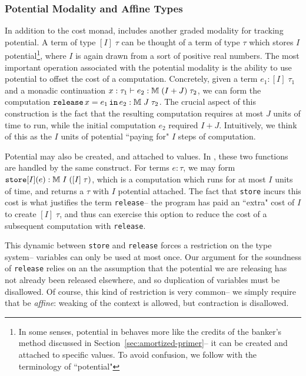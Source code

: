 \subsubsection{Potential Modality and Affine Types}
In addition to the cost monad, \lambdaamor includes another graded modality for tracking potential. A term of type $[I] \; \tau$ can be thought of a term of type $\tau$ which stores $I$ potential\footnote{
In some senses, potential in \lambdaamor behaves more like the credits of the banker's method discussed in Section~\ref{sec:amortized-primer}-- it can be created and attached to specific values. To avoid confusion, we follow \citet{rajani-et-al:popl21} with the terminology of ``potential"
}, where $I$ is again drawn from a sort of positive real numbers.
The most important operation associated with the potential modality is the ability to use potential to offset the cost of a computation. Concretely, given a term $e_1 : [I] \; \tau_1$ and a monadic continuation $x : \tau_1 \vdash e_2 : \mathbb{M} \; (I + J) \; \tau_2$, we can form the computation $\texttt{release}\, x = e_1 \, \texttt{in}\, e_2 : \mathbb{M} \; J \; \tau_2$. The crucial aspect of this construction is the fact that the resulting computation requires at most $J$ units of time to run, while the initial computation $e_2$ required $I + J$. Intuitively, we think of this as the $I$ units of potential ``paying for" $I$ steps of computation. 

Potential may also be created, and attached to values. In \lambdaamor, these two functions are handled by the same construct. For terms $e : \tau$, we may form $\texttt{store}[I](e) : \mathbb{M} \; I \; ([I] \; \tau)$, which is a computation which runs for at most $I$ units of time, and returns a $\tau$ with $I$ potential attached. The fact that \texttt{store} incurs this cost is what justifies the term \texttt{release}-- the program has paid an ``extra" cost of $I$ to create $[I] \; \tau$, and thus can exercise this option to reduce the cost of a subsequent computation with \texttt{release}.

This dynamic between \texttt{store} and \texttt{release} forces a restriction on the type system-- variables can only be used at most once. Our argument for the soundness of \texttt{release} relies on an the assumption that the potential we are releasing has not already been released elsewhere, and so duplication of variables must be disallowed. Of course, this kind of restriction is very common-- we simply require that \lambdaamor be \textit{affine}: weaking of the context is allowed, but contraction is disallowed. 


